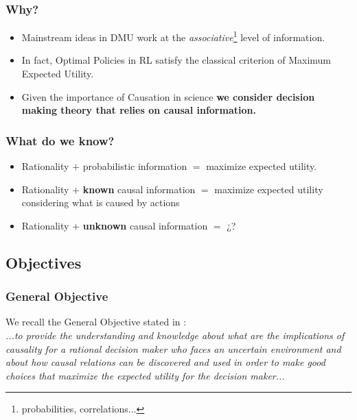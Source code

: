 \documentclass{beamer}
\theoremstyle{plain}
\begin{document}
\begin{frame}
\frametitle{Why?}
\begin{itemize}
\item Mainstream ideas in DMU work at the \textit{associative}\footnote{probabilities, correlations...} level of information.
\item In fact, Optimal Policies in RL satisfy the classical criterion of Maximum Expected Utility.
\item Given the importance of Causation in science \textbf{we consider decision making theory that relies on causal information.}
\end{itemize}
\end{frame}

\begin{frame}
\frametitle{What do we know?}
\begin{itemize}
\item Rationality $+$ probabilistic information $=$ maximize expected utility.
\item Rationality $+$ \textbf{known} causal information $=$ maximize expected utility considering what is caused by actions \citep{pearl2009causality,lattimoreNIPS2016}
\item Rationality $+$ \textbf{unknown} causal information $=$ ¿? 
\end{itemize}
\end{frame}

\subsection{Objectives}
\begin{frame}
\frametitle{General Objective}
We recall the General Objective stated in \cite{gonzalez2019causal}:
\\
\textit{...to provide the understanding and knowledge about what are the implications of causality for a rational decision maker who faces an uncertain environment and about how causal relations can be discovered and used in order to make good choices that maximize the expected utility for the decision maker...}
\end{frame}
\end{document}
